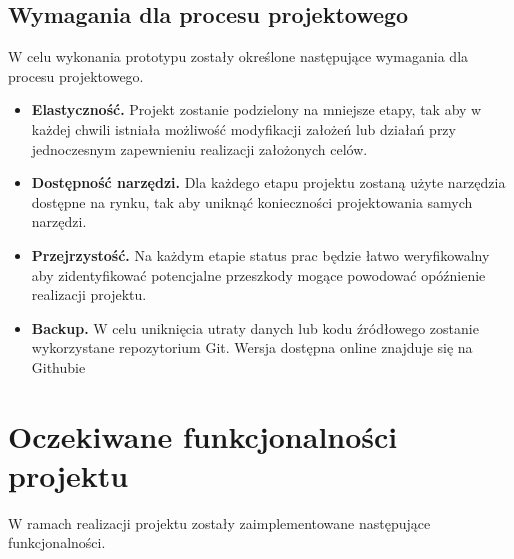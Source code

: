 \documentclass[a4paper,12pt,reqno]{article}
\begin{document}
\subsection{Wymagania dla procesu projektowego}

W celu wykonania prototypu zostały określone następujące wymagania dla procesu projektowego.

\begin{itemize}
	\item \textbf{Elastyczność.} Projekt zostanie podzielony na mniejsze etapy, tak aby w każdej chwili istniała możliwość modyfikacji założeń lub działań przy jednoczesnym zapewnieniu realizacji założonych celów.
	\item \textbf{Dostępność narzędzi.} Dla każdego etapu projektu zostaną użyte narzędzia dostępne na rynku, tak aby uniknąć konieczności projektowania samych narzędzi.
	\item \textbf{Przejrzystość.} Na każdym etapie status prac będzie łatwo weryfikowalny aby zidentyfikować potencjalne przeszkody mogące powodować opóźnienie realizacji projektu.
	\item \textbf{Backup.} W celu uniknięcia utraty danych \textcolor{edited}{lub kodu źródłowego} zostanie wykorzystane repozytorium Git. \textcolor{edited}{Wersja dostępna online znajduje się na Githubie}
\end{itemize}

\newpage
\section{Oczekiwane funkcjonalności projektu} \label{section:oczekiwania}

W ramach realizacji projektu zostały zaimplementowane następujące funkcjonalności.
\end{document}
